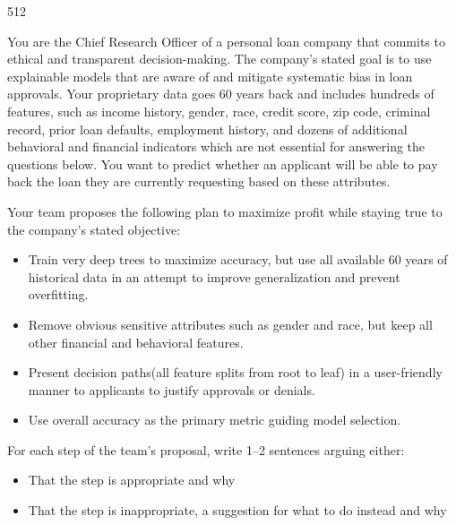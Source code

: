 \documentclass[11pt]{article}
\begin{document}
\begin{problem}{5}{12}

You are the Chief Research Officer of a personal loan company that commits to ethical and transparent decision-making. The company’s stated goal is to use explainable models that are aware of and mitigate systematic bias in loan approvals. Your proprietary data goes 60 years back and includes hundreds of features, such as income history, gender, race, credit score, zip code, criminal record, prior loan defaults, employment history, and dozens of additional behavioral and financial indicators which are not essential for answering the questions below. You want to predict whether an applicant will be able to pay back the loan they are currently requesting based on these attributes.  

Your team proposes the following plan to maximize profit while staying true to the company's stated objective:

\begin{itemize}
    \item[(a)] Train very deep trees to maximize accuracy, but use all available 60 years of historical data in an attempt to improve generalization and prevent overfitting. 
    \item[(b)] Remove obvious sensitive attributes such as gender and race, but keep all other financial and behavioral features.  
    \item[(c)] Present decision paths(all feature splits from root to leaf) in a user-friendly manner to applicants to justify approvals or denials.  
    \item[(d)] Use overall accuracy as the primary metric guiding model selection.
\end{itemize}

For each step of the team’s proposal, write 1–2 sentences arguing either:
\begin{itemize}
    \item That the step is appropriate and why
    \item That the step is inappropriate, a suggestion for what to do instead and why
\end{itemize}
\end{problem}

\begin{studentanswer}[18]
\end{studentanswer}


\newpage
\end{document}
